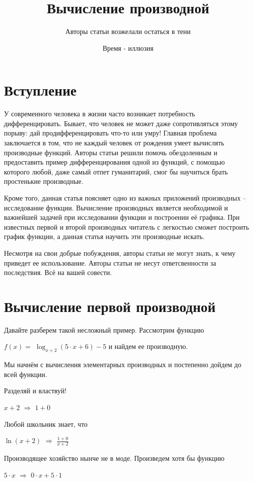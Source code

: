 \documentclass{article}
\title{Вычисление производной}
\author{Авторы статьи возжелали остаться в тени}
\date{Время - иллюзия}
\begin{document}
\maketitle

\section{Вступление}

У современного человека в жизни часто возникает потребность дифференцировать. Бывает, что человек не может даже сопротивляться этому порыву: дай продифференцировать что-то или умру! Главная проблема заключается в том, что не каждый человек от рождения умеет вычислять производные функций. Авторы статьи решили помочь обездоленным и предоставить пример дифференцирования одной из функций, с помощью которого любой, даже самый отпет гуманитарий, смог бы научиться брать простенькие производные.

Кроме того, данная статья поясняет одно из важных приложений производных -- исследование функции. Вычисление производных является необходимой и важнейшей задачей при исследовании функции и построении её графика. При известных первой и второй производных читатель с легкостью сможет построить график функции, а данная статья научить эти производные искать.

Несмотря на свои добрые побуждения, авторы статьи не могут знать, к чему приведет ее использование. Авторы статьи не несут ответсвенности за последствия. Всё на вашей совести.

\section{Вычисление первой производной}

Давайте разберем такой несложный пример. Рассмотрим функцию 

$f(x) = $ $\log_{x + 2}(5 \cdot x + 6) - 5$ и найдем ее производную.

Мы начнём с вычисления элементарных производных и постепенно дойдем до всей функции.

Разделяй и властвуй!

$x + 2$ $\Rightarrow$ $1 + 0$

Любой школьник знает, что

$ \ln (x + 2)$ $\Rightarrow$ $\frac{1 + 0}{x + 2}$

Производящее хозяйство нынче не в моде. Произведем хотя бы функцию

$5 \cdot x$ $\Rightarrow$ $0 \cdot x + 5 \cdot 1$
\end{document}
